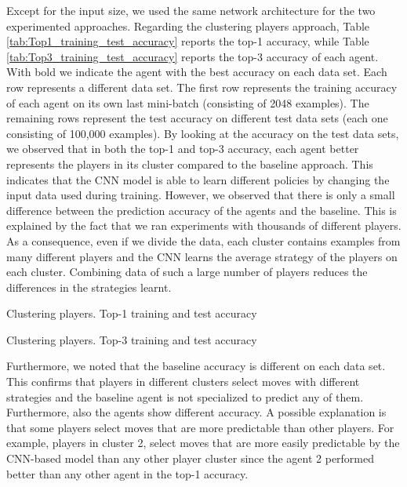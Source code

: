 Except for the input size, we used the same network architecture for the two experimented approaches. Regarding the clustering players approach, Table \ref{tab:Top1_training_test_accuracy} reports the top-1 accuracy, while Table \ref{tab:Top3_training_test_accuracy} reports the top-3 accuracy of each agent. 
With bold we indicate the agent with the best accuracy on each data set. Each row represents a different data set. The first row represents the training accuracy of each agent on its own last mini-batch (consisting of 2048 examples). The remaining rows represent the test accuracy on different test data sets (each one consisting of 100,000 examples). By looking at the accuracy on the test data sets, we observed that in both the top-1 and top-3 accuracy, each agent better represents the players in its cluster compared to the baseline approach. This indicates that the \acs{CNN} model is able to learn different policies by changing the input data used during training. However, we observed that there is only a small difference between the prediction accuracy of the agents and the baseline. This is explained by the fact that we ran experiments with thousands of different players. As a consequence, even if we divide the data, each cluster contains examples from many different players and the \acs{CNN} learns the average strategy of the players on each cluster. Combining data of such a large number of players reduces the differences in the strategies learnt.
\begin{table}[H]
    \centering
    \small
    \caption{Clustering players. Top-1 training and test accuracy} 
    
    \label{tab:Top1_training_test_accuracy}
\end{table}
\begin{table}[H]
    \centering
    \small
    \caption{Clustering players. Top-3 training and test accuracy} 
    
    \label{tab:Top3_training_test_accuracy}
\end{table}
Furthermore, we noted that the baseline accuracy is different on each data set.
This confirms that players in different clusters select moves with different strategies and the baseline agent is not specialized to predict any of them. Furthermore, also the agents show different accuracy. A possible explanation is that some players select moves that are more predictable than other players. For example, players in cluster 2, select moves that are more easily predictable by the \acs{CNN}-based model than any other player cluster since the agent 2 performed better than any other agent in the top-1 accuracy.
